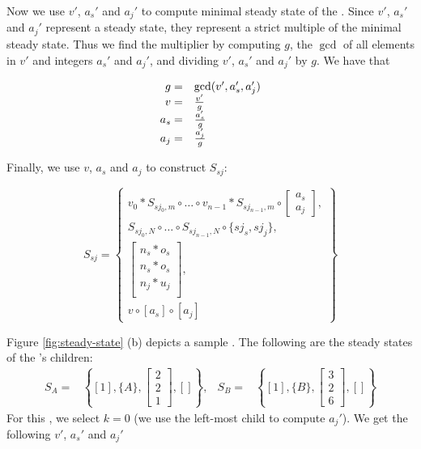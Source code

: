 Now we use $v'$, $a_s'$ and $a_j'$ to compute minimal steady state
of the {\splitjoin}.  Since $v'$, $a_s'$ and $a_j'$ represent a
steady state, they represent a strict multiple of the minimal
steady state.  Thus we find the multiplier by computing $g$, the
$\gcd$ of all elements in $v'$ and integers $a_s'$ and $a_j'$, and
dividing $v'$, $a_s'$ and $a_j'$ by $g$.  We have that

\begin{displaymath}
\begin{array}{rl}
g = & \gcd(v', a_s', a_j') \\
v = & v' \over g \\
a_s = &  a_s' \over g \\
a_j = & a_j' \over g
\end{array}
\end{displaymath}

Finally, we use $v$, $a_s$ and $a_j$ to construct $S_{sj}$:

\begin{displaymath}
S_{sj} = \left\{
\begin{array}{c}
v_0 * S_{sj_0,m} \circ \dots \circ v_{n-1} * S_{sj_{n-1}, m} \circ
\left[\begin{array}{c}a_s\\a_j\end{array}\right] , \\
S_{sj_0, N} \circ \dots \circ S_{sj_{n-1}, N} \circ \{sj_s,
sj_j\},
\\ \left[
\begin{array}{c}
n_s * o_{s} \\
n_s * o_{s} \\
n_j * u_{j} \\
\end{array}\right], \\
v \circ [a_s] \circ [a_j]
\end{array}\right\}
\end{displaymath}

Figure \ref{fig:steady-state} (b) depicts a sample {\splitjoin}.
The following are the steady states of the {\splitjoin}'s
children: $$
\begin{array}{lrlr} S_A = & \left\{[1], \{A\}, { \left[
\begin{array}{c} 2 \\ 2 \\ 1
\end{array}
\right]}, [] \right\}, & S_B = & \left\{[1], \{B\}, { \left[
\begin{array}{c} 3 \\ 2 \\ 6
\end{array}
\right]}, [] \right\}
\end{array}
$$ For this {\splitjoin}, we select $k = 0$ (we use the left-most child
to compute $a_j'$).  We get the following $v'$, $a_s'$ and $a_j'$

